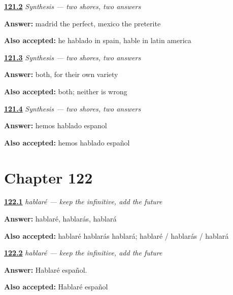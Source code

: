 \noindent\begin{minipage}[t]{\linewidth}
\raggedright
\hyperlink{review-ES-C49-sintesis-dos-orillas-split}{\textbf{121.2}} \emph{Synthesis — two shores, two answers}\par
\small \textbf{Answer:} madrid the perfect, mexico the preterite\par
\footnotesize \textbf{Also accepted:} he hablado in spain, hable in latin america
\end{minipage}\par\medskip

\noindent\begin{minipage}[t]{\linewidth}
\raggedright
\hyperlink{review-ES-C49-sintesis-dos-orillas-wrong}{\textbf{121.3}} \emph{Synthesis — two shores, two answers}\par
\small \textbf{Answer:} both, for their own variety\par
\footnotesize \textbf{Also accepted:} both; neither is wrong
\end{minipage}\par\medskip

\noindent\begin{minipage}[t]{\linewidth}
\raggedright
\hyperlink{review-ES-C49-sintesis-dos-orillas-build}{\textbf{121.4}} \emph{Synthesis — two shores, two answers}\par
\small \textbf{Answer:} hemos hablado espanol\par
\footnotesize \textbf{Also accepted:} hemos hablado español
\end{minipage}\par\medskip

\section*{Chapter 122}

\noindent\begin{minipage}[t]{\linewidth}
\raggedright
\hyperlink{review-ES-C17-futuro-singular-forms}{\textbf{122.1}} \emph{hablaré — keep the infinitive, add the future}\par
\small \textbf{Answer:} hablaré, hablarás, hablará\par
\footnotesize \textbf{Also accepted:} hablaré hablarás hablará; hablaré / hablarás / hablará
\end{minipage}\par\medskip

\noindent\begin{minipage}[t]{\linewidth}
\raggedright
\hyperlink{review-ES-C17-futuro-hablare-espanol}{\textbf{122.2}} \emph{hablaré — keep the infinitive, add the future}\par
\small \textbf{Answer:} Hablaré español.\par
\footnotesize \textbf{Also accepted:} Hablaré español
\end{minipage}\par\medskip

